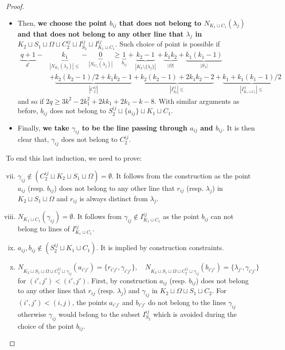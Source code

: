 \documentclass[a4paper,UKenglish,cleveref, autoref, thm-restate]{arxiv}
\newcommand{\ls}{\leqslant}
\newcommand{\gs}{\geqslant}
\begin{document}
\begin{proof}
\begin{itemize}
            \item Then, \textbf{we choose the point $b_{ij}$ that does not belong to $N_{K_1 \sqcup C_1}(\lambda_j)$ and that does not belong to any other line that $\lambda_j$ in $K_2 \sqcup S_1 \sqcup \Omega \sqcup C_2^{ij} \sqcup I_{S_2}^{ij} \sqcup I_{K_1\sqcup C_1}^{ij}$}. Such choice of point is possible if \begin{align*} \underbrace{q+1}_{d^\circ} - &\underbrace{k_1}_{|N_{K_1}(\lambda_j)|\ls} - \underbrace{0}_{|N_{C_1}(\lambda_j)|} \gs \underbrace{1}_{b_{ij}} + \underbrace{k_2 - 1}_{|K_2 \setminus \{\lambda_j\}|} + \underbrace{k_1k_2}_{|\Omega|} + \underbrace{k_1(k_1-1)}_{|S_1|}\\ &+ \underbrace{k_2(k_2-1)/2+k_1k_2 - 1}_{|C_2^{ij}|} + \underbrace{k_2(k_2-1) + 2k_1k_2 - 2}_{|I_{S_2}^{ij}| \ls} + \underbrace{k_1 + k_1(k_1-1)/2}_{|I_{K_1\sqcup C_1}^{ij}| \ls} \end{align*} and so if $2q \gs 3k^2 - 2k_1^2+2kk_1+2k_1-k-8$. With similar arguments as before,  $b_{ij}$ does not belong to $S_2^{ij} \sqcup \{a_{ij}\} \sqcup K_1 \sqcup C_1$.
            \item Finally, \textbf{we take $\gamma_{ij}$ to be the line passing through  $a_{ij}$ and $b_{ij}$}. It is then clear that, $\gamma_{ij}$ does not belong to $C_2^{ij}$.
        \end{itemize}
        To end this last induction, we need to prove:
        \begin{enumerate}[(i)]
            \setcounter{enumi}{6}
            \item$\gamma_{ij} \notin (C_2^{ij} \sqcup K_2 \sqcup S_1 \sqcup \Omega) = \emptyset$. It follows from the construction as the point $a_{ij}$ (resp. $b_{ij}$) does not belong to any other line that $r_{ij}$ (resp. $\lambda_j$) in $K_2 \sqcup S_1 \sqcup \Omega$ and $r_{ij}$ is always distinct from $\lambda_j$.
            \item $N_{K_1 \sqcup C_1}(\gamma_{ij}) = \emptyset $. It follows from $\gamma_{ij} \notin I_{K_1\sqcup C_1}^{ij}$ as the point $b_{ij}$ can not belong to lines of $I_{K_1\sqcup C_1}^{ij}$.
            \item $a_{ij}, b_{ij} \notin (S_2^{ij} \sqcup K_1 \sqcup C_1)$. It is implied by construction constraints.
            \item $N_{K_2 \sqcup S_1 \sqcup \Omega \sqcup C_2^{ij}\sqcup \gamma_{ij}}(a_{i'j'}) = \{r_{i'j'},\gamma_{i'j'}\}, \quad N_{K_2 \sqcup S_1 \sqcup \Omega \sqcup C_2^{ij}\sqcup \gamma_{ij}}(b_{i'j'}) = \{\lambda_{j'}, \gamma_{i'j'}\}$ \\ for $(i',j') < (i', j')$. First, by construction $a_{ij}$ (resp. $b_{ij}$) does not belong to any other lines that $r_{ij}$ (resp. $\lambda_j$) and $\gamma_{ij}$ in $K_2 \sqcup \Omega \sqcup S_1 \sqcup C_2$. For $(i', j') < (i, j)$, the points $a_{i'j'}$ and $b_{i'j'}$ do not belong to the lines $\gamma_{ij}$ otherwise $\gamma_{ij}$ would belong to the subset $I_{S_2}^{ij}$ which is avoided during the choice of the point $b_{ij}$.
        \end{enumerate}



\end{proof}
\end{document}
